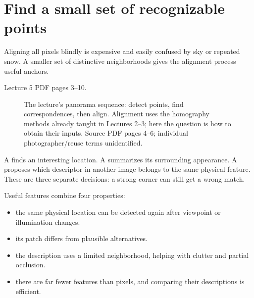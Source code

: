 \documentclass[letterpaper,11pt,english,openany,oneside]{jupyterBook}
\begin{document}
\sphinxstepscope


\section{Find a small set of recognizable points}
\label{\detokenize{lectures/lecture05/features:find-a-small-set-of-recognizable-points}}\label{\detokenize{lectures/lecture05/features:lec05-features}}\label{\detokenize{lectures/lecture05/features::doc}}
\sphinxAtStartPar
{} Aligning all pixels blindly is expensive and easily confused by sky or repeated snow. A smaller set of distinctive neighborhoods gives the alignment process useful anchors.

\sphinxAtStartPar
{} Lecture 5 PDF pages 3–10.

\begin{figure}[H]
\centering
\capstart

\noindent{}
\caption{The lecture’s panorama sequence: detect points, find correspondences, then align. Alignment uses the homography methods already taught in Lectures 2–3; here the question is how to obtain their inputs. Source PDF pages 4–6; individual photographer/reuse terms unidentified.}\label{\detokenize{lectures/lecture05/features:fig-lec05-panorama}}\end{figure}

\sphinxAtStartPar
A  finds an interesting location. A  summarizes its surrounding appearance. A  proposes which descriptor in another image belongs to the same physical feature. These are three separate decisions: a strong corner can still get a wrong match.

\sphinxAtStartPar
Useful features combine four properties:
\begin{itemize}
\item {}
\sphinxAtStartPar
{} the same physical location can be detected again after viewpoint or illumination changes.

\item {}
\sphinxAtStartPar
{} its patch differs from plausible alternatives.

\item {}
\sphinxAtStartPar
{} the description uses a limited neighborhood, helping with clutter and partial occlusion.

\item {}
\sphinxAtStartPar
{} there are far fewer features than pixels, and comparing their descriptions is efficient.

\end{itemize}
\end{document}
